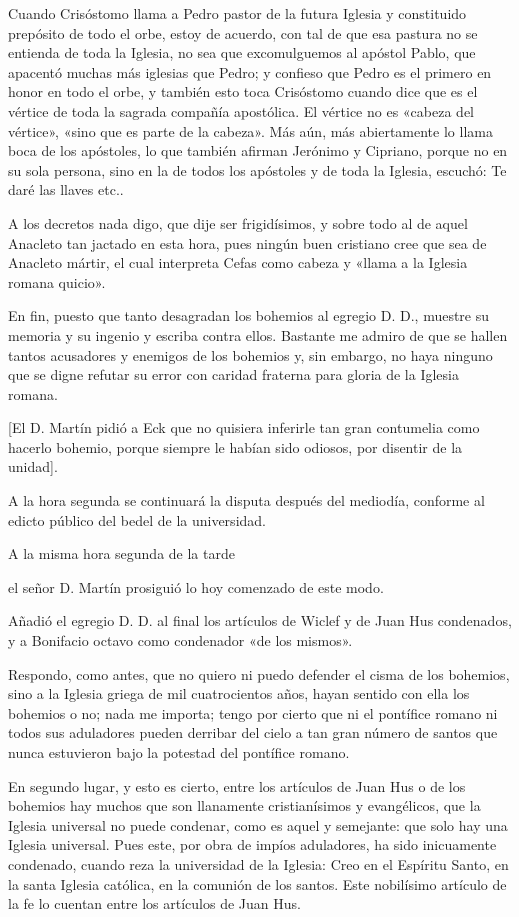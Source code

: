 Cuando Crisóstomo llama a Pedro pastor de la futura Iglesia y constituido prepósito de todo el orbe, estoy de acuerdo, con tal de que esa pastura no se entienda de toda la Iglesia, no sea que excomulguemos al apóstol Pablo, que apacentó muchas más iglesias que Pedro; y confieso que Pedro es el primero en honor en todo el orbe, y también esto toca Crisóstomo cuando dice que es el vértice de toda la sagrada compañía apostólica. El vértice no es «cabeza del vértice», «sino que es parte de la cabeza». Más aún, más abiertamente lo llama boca de los apóstoles, lo que también afirman Jerónimo y Cipriano, porque no en su sola persona, sino en la de todos los apóstoles y de toda la Iglesia, escuchó: Te daré las llaves etc..

A los decretos nada digo, que dije ser frigidísimos, y sobre todo al de aquel Anacleto tan jactado en esta hora, pues ningún buen cristiano cree que sea de Anacleto mártir, el cual interpreta Cefas como cabeza y «llama a la Iglesia romana quicio».

En fin, puesto que tanto desagradan los bohemios al egregio D. D., muestre su memoria y su ingenio y escriba contra ellos. Bastante me admiro de que se hallen tantos acusadores y enemigos de los bohemios y, sin embargo, no haya ninguno que se digne refutar su error con caridad fraterna para gloria de la Iglesia romana.

[El D. Martín pidió a Eck que no quisiera inferirle tan gran contumelia como hacerlo bohemio, porque siempre le habían sido odiosos, por disentir de la unidad].

\marginpar{\small[279]} A la hora segunda se continuará la disputa después del mediodía, conforme al edicto público del bedel de la universidad.

A la misma hora segunda de la tarde

el señor D. Martín prosiguió lo hoy comenzado de este modo.

Añadió el egregio D. D. al final los artículos de Wiclef y de Juan Hus condenados, y a Bonifacio octavo como condenador «de los mismos».

Respondo, como antes, que no quiero ni puedo defender el cisma de los bohemios, sino a la Iglesia griega de mil cuatrocientos años, hayan sentido con ella los bohemios o no; nada me importa; tengo por cierto que ni el pontífice romano ni todos sus aduladores pueden derribar del cielo a tan gran número de santos que nunca estuvieron bajo la potestad del pontífice romano.

En segundo lugar, y esto es cierto, entre los artículos de Juan Hus o de los bohemios hay muchos que son llanamente cristianísimos y evangélicos, que la Iglesia universal no puede condenar, como es aquel y semejante: que solo hay una Iglesia universal. Pues este, por obra de impíos aduladores, ha sido inicuamente condenado, cuando reza la universidad de la Iglesia: Creo en el Espíritu Santo, en la santa Iglesia católica, en la comunión de los santos. Este nobilísimo artículo de la fe lo cuentan entre los artículos de Juan Hus.

